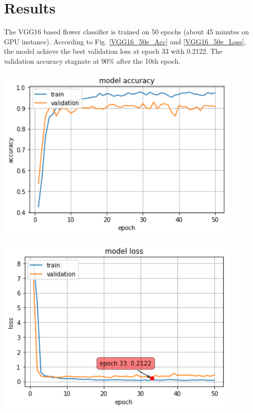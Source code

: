 \section{Results}

The VGG16 based flower classifier is trained on 50 epochs (about 45 minutes on GPU instance). According to Fig. \ref{VGG16_50e_Acc} and \ref{VGG16_50e_Loss}, the model achieve the best validation loss at epoch 33 with 0.2122. The validation accuracy stagnate at 90\% after the 10th epoch.

\begin{center}
	\centering
	\begin{minipage}{0.5\textwidth}
		\centering
		\includegraphics[width=0.9\textwidth]{./sections/04_results/output_33_0.png}
		\label{VGG16_50e_Acc}
	\end{minipage}\hfill
	\begin{minipage}{0.5\textwidth}
		\centering
		\includegraphics[width=0.9\textwidth]{./sections/04_results/output_33_1.png} 
		\label{VGG16_50e_Loss}
	\end{minipage}
\end{center}

